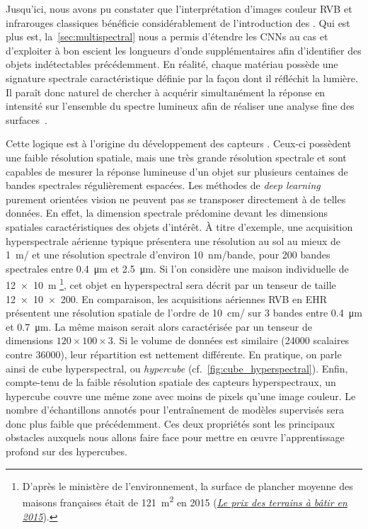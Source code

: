 Jusqu'ici, nous avons pu constater que l'interprétation d'images couleur \gls{RVB} et infrarouges classiques bénéficie considérablement de l'introduction des . Qui est plus est, la~\cref{sec:multispectral} nous a permis d'étendre les \glspl{CNN} au cas  et d'exploiter à bon escient les longueurs d'onde supplémentaires afin d'identifier des objets indétectables précédemment. En réalité, chaque matériau possède une signature spectrale caractéristique définie par la façon dont il réfléchit la lumière. Il paraît donc naturel de chercher à acquérir simultanément la réponse en intensité sur l'ensemble du spectre lumineux afin de réaliser une analyse fine des surfaces~\cite{cubero-castan_physics-based_2015,fabre_estimation_2015}.

Cette logique est à l'origine du développement des capteurs . Ceux-ci possèdent une faible résolution spatiale, mais une très grande résolution spectrale et sont capables de mesurer la réponse lumineuse d'un objet sur plusieurs centaines de bandes spectrales régulièrement espacées. Les méthodes de \emph{deep learning} purement orientées vision ne peuvent pas se transposer directement à de telles données. En effet, la dimension spectrale prédomine devant les dimensions spatiales caractéristiques des objets d'intérêt. À titre d'exemple, une acquisition hyperspectrale aérienne typique présentera une résolution au sol au mieux de \SI{1}{\meter/\px} et une résolution spectrale d'environ \SI{10}{\nano\meter/bande}, pour 200 bandes spectrales entre \SI{0,4}{\micro\meter} et \SI{2,5}{\micro\meter}. Si l'on considère une maison individuelle de \SI{12x10}{\meter} \footnote{D'après le ministère de l'environnement, la surface de plancher moyenne des maisons françaises était de \SI{121}{\meter\squared} en 2015 (\href{http://www.cohesion-territoires.gouv.fr/IMG/pdf/datalab-essentiel-51-le-prix-des-terrains-a-batir-en-2015-oct2016.pdf}{\og \emph{Le prix des terrains à bâtir en 2015\fg}}).}, cet objet en hyperspectral sera décrit par un tenseur de taille \num{12x10x200}.
En comparaison, les acquisitions aériennes \gls{RVB} en \gls{EHR} présentent une résolution spatiale de l'ordre de \SI{10}{\centi\meter/\px} sur 3 bandes entre \SI{0,4}{\micro\meter} et \SI{0,7}{\micro\meter}. La même maison serait alors caractérisée par un tenseur de dimensions $120\times100\times3$. Si le volume de données est similaire (\num{24000} scalaires contre \num{36000}), leur répartition est nettement différente. En pratique, on parle ainsi de cube hyperspectral, ou \emph{hypercube} (cf.~\cref{fig:cube_hyperspectral}). Enfin, compte-tenu de la faible résolution spatiale des capteurs hyperspectraux, un hypercube couvre une même zone avec moins de pixels qu'une image couleur. Le nombre d'échantillons annotés pour l'entraînement de modèles supervisés sera donc plus faible que précédemment. Ces deux propriétés sont les principaux obstacles auxquels nous allons faire face pour mettre en \oe{}uvre l'apprentissage profond sur des hypercubes.

